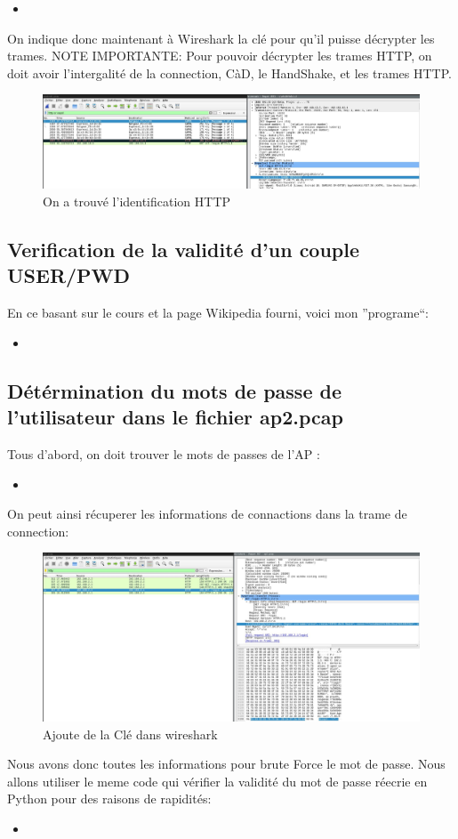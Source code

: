 \documentclass[10pt,a4paper]{article}
\newcommand{\insertcode}[2]{\begin{itemize}\item[]\end{itemize}}
\begin{document}
\insertcode{code/manipBuddy}{On à reussi}
On indique donc maintenant à Wireshark la clé pour qu'il puisse décrypter les trames.
NOTE IMPORTANTE: Pour pouvoir décrypter les trames HTTP, on doit avoir l'intergalité de la connection, CàD, le HandShake, et les trames HTTP.
\begin{figure}[h!]
\centering
\includegraphics[scale=0.250]{image/6.jpg}
\caption{On a trouvé l'identification HTTP}
\label{fig:net }
\end{figure}
\newpage
\subsection{Verification de la validité d'un couple USER/PWD}
En ce basant sur le cours et la page Wikipedia fourni, voici mon ''programe``:
\insertcode{manip/digest_auth.sh}{Digest Auth }
\subsection{Détérmination du mots de passe de l'utilisateur dans le fichier ap2.pcap}
Tous d'abord, on doit trouver le mots de passes de l'AP :
\insertcode{code/manipAP2I}{71862093}
On peut ainsi récuperer les informations de connactions dans la trame de connection:
\begin{figure}[h!]
\centering
\includegraphics[scale=0.250]{image/7.jpg}
\caption{Ajoute de la Clé dans wireshark}
\label{fig:net }
\end{figure}
Nous avons donc toutes les informations pour brute Force le mot de passe. Nous allons utiliser le meme code qui vérifier la validité du mot de passe réecrie en Python pour des raisons de rapidités:
\insertcode{manip/digest_authAP2.py}{digest authentification python}
\newpage
\end{document}
